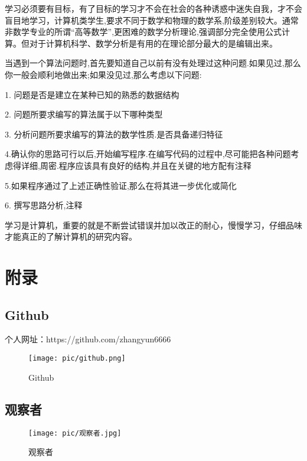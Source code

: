 \documentclass{article}
\begin{document}
学习必须要有目标，有了目标的学习才不会在社会的各种诱惑中迷失自我，才不会盲目地学习，计算机类学生,要求不同于数学和物理的数学系,阶级差别较大。通常非数学专业的所谓“高等数学”,更困难的数学分析理论,强调部分完全使用公式计算。但对于计算机科学、数学分析是有用的在理论部分最大的是编辑出来。\par
当遇到一个算法问题时,首先要知道自己以前有没有处理过这种问题.如果见过,那么你一般会顺利地做出来;如果没见过,那么考虑以下问题:\par
1. 问题是否是建立在某种已知的熟悉的数据结构\par
2. 问题所要求编写的算法属于以下哪种类型 \par
3. 分析问题所要求编写的算法的数学性质.是否具备递归特征\par
4.确认你的思路可行以后,开始编写程序.在编写代码的过程中,尽可能把各种问题考虑得详细,周密.程序应该具有良好的结构,并且在关键的地方配有注释\par 
5.如果程序通过了上述正确性验证,那么在将其进一步优化或简化 \par
6. 撰写思路分析,注释\par
学习是计算机，重要的就是不断尝试错误并加以改正的耐心，慢慢学习，仔细品味才能真正的了解计算机的研究内容。





\section{附录}

\subsection{Github}
     \quad 个人网址：https://github.com/zhangyun6666
    \begin{figure}[!h]
    	\begin{center}
    		\texttt{[image: pic/github.png]}
    		\caption{Github}
    	\end{center}
    \end{figure}
    
     
\subsection{观察者}
    \begin{figure}[!h]
    	\begin{center}
    		\texttt{[image: pic/观察者.jpg]}
    		\caption{观察者}
    	\end{center}
    \end{figure}
\end{document}
